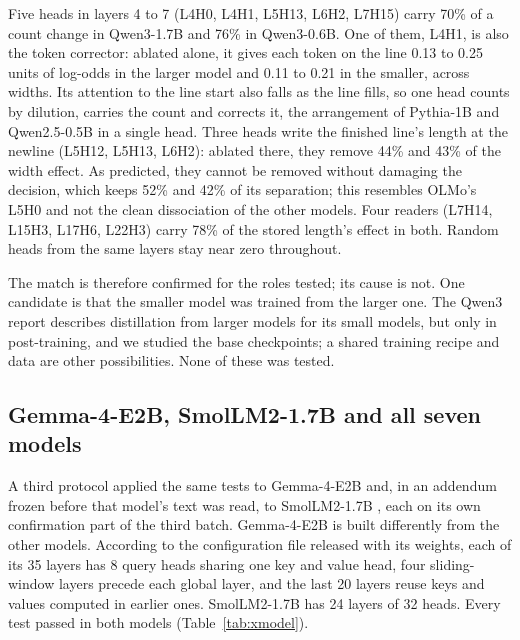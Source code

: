 \documentclass[11pt,a4paper]{article}
\begin{document}
Five heads in layers 4 to 7 (L4H0, L4H1, L5H13, L6H2, L7H15) carry 70\% of a count change in Qwen3-1.7B and 76\% in Qwen3-0.6B. One of them, L4H1, is also the token corrector: ablated alone, it gives each token on the line 0.13 to 0.25 units of log-odds in the larger model and 0.11 to 0.21 in the smaller, across widths. Its attention to the line start also falls as the line fills, so one head counts by dilution, carries the count and corrects it, the arrangement of Pythia-1B and Qwen2.5-0.5B in a single head. Three heads write the finished line's length at the newline (L5H12, L5H13, L6H2): ablated there, they remove 44\% and 43\% of the width effect. As predicted, they cannot be removed without damaging the decision, which keeps 52\% and 42\% of its separation; this resembles OLMo's L5H0 and not the clean dissociation of the other models. Four readers (L7H14, L15H3, L17H6, L22H3) carry 78\% of the stored length's effect in both. Random heads from the same layers stay near zero throughout.

The match is therefore confirmed for the roles tested; its cause is not. One candidate is that the smaller model was trained from the larger one. The Qwen3 report describes distillation from larger models for its small models, but only in post-training, and we studied the base checkpoints; a shared training recipe and data are other possibilities. None of these was tested.

\subsection{Gemma-4-E2B, SmolLM2-1.7B and all seven models}
\label{sec:xmodel7}

A third protocol applied the same tests to Gemma-4-E2B \citep{gemma2026gemma4} and, in an addendum frozen before that model's text was read, to SmolLM2-1.7B \citep{benallal2025smollm2}, each on its own confirmation part of the third batch. Gemma-4-E2B is built differently from the other models. According to the configuration file released with its weights, each of its 35 layers has 8 query heads sharing one key and value head, four sliding-window layers precede each global layer, and the last 20 layers reuse keys and values computed in earlier ones. SmolLM2-1.7B has 24 layers of 32 heads. Every test passed in both models (Table~\ref{tab:xmodel}).
\end{document}
